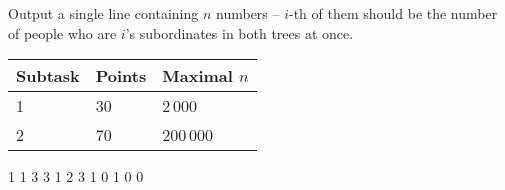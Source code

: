 
Output a single line containing $n$ numbers -- $i$-th of them should be the number of people who are $i$'s subordinates in both trees at once.


\centering
\begin{tabular}{|l|l|l|}
\hline
Subtask & Points & Maximal $n$  \\ \hline
1       & 30     & 2\,000          \\ \hline
2       & 70     & 200\,000        \\ \hline
\end{tabular}


1 1 3 3
1 2 3 1
 0 1 0 0 

\sampleEND


